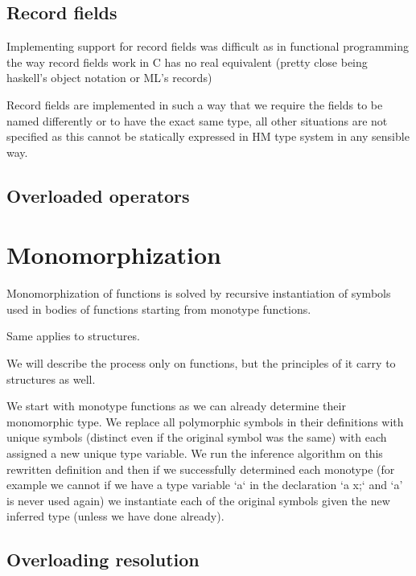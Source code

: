 \subsection{Record fields}

Implementing support for record fields was difficult as in functional programming the way
record fields work in C has no real equivalent (pretty close being haskell's object notation or ML's records)

Record fields are implemented in such a way that we require the fields to be named differently
or to have the exact same type, all other situations are not specified as this cannot be
statically expressed in HM type system in any sensible way.


\subsection{Overloaded operators}

\section{Monomorphization}

Monomorphization of functions is solved by recursive instantiation of symbols used in bodies of functions
starting from monotype functions.

Same applies to structures.

We will describe the process only on functions, but the principles of it carry to structures as well.

We start with monotype functions as we can already determine their monomorphic type. We replace all polymorphic
symbols in their definitions with unique symbols (distinct even if the original symbol was the same) with each
assigned a new unique type variable. We run the inference algorithm on this rewritten definition and then if
we successfully determined each monotype (for example we cannot if we have a type variable `a` in the declaration `a x;`
and `a' is never used again) we instantiate each of the original symbols given the new inferred type (unless we have done already).

\subsection{Overloading resolution}

